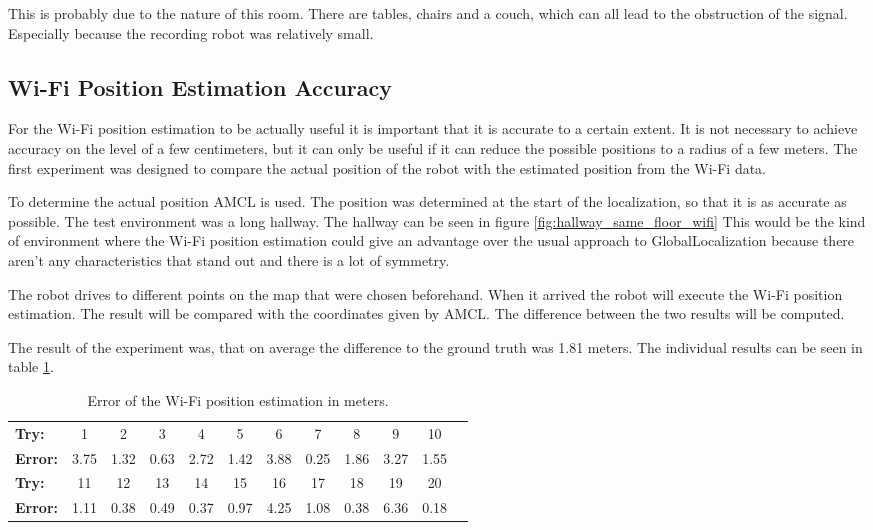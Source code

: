 This is probably due to the nature of this room. There are tables, chairs and a couch, which can all lead to the obstruction of the signal. Especially because the recording robot was relatively small. 

\subsection{Wi-Fi Position Estimation Accuracy}\label{sec:acc}
For the Wi-Fi position estimation to be actually useful it is important that it is accurate to a certain extent. It is not necessary to achieve accuracy on the level of a few centimeters, but it can only be useful if it can reduce the possible positions to a radius of a few meters. The first experiment was designed to compare the actual position of the robot with the estimated position from the Wi-Fi data. 

To determine the actual position AMCL is used. The position was determined at the start of the localization, so that it is as accurate as possible. The test environment was a long hallway. The hallway can be seen in figure \ref{fig:hallway_same_floor_wifi} This would be the kind of environment where the Wi-Fi position estimation could give an advantage over the usual approach to \gls{GlobalLocalization} because there aren't any characteristics that stand out and there is a lot of symmetry. 

The robot drives to different points on the map that were chosen beforehand. When it arrived the robot will execute the Wi-Fi position estimation. The result will be compared with the coordinates given by AMCL. The difference between the two results will be computed.

The result of the experiment was, that on average the difference to the ground truth was 1.81 meters. The individual results can be seen in table \ref{table:exp1}.

\begin{table}
\caption{Error of the Wi-Fi position estimation in meters.}
\label{table:exp1}
\begin{tabular}{l*{10}{c}r}
  \hline			
  \bf Try: & 1 & 2 & 3 & 4 & 5 & 6 & 7 & 8 & 9 & 10 \\
  \bf Error: & 3.75 & 1.32 & 0.63 & 2.72 & 1.42 & 3.88 & 0.25 & 1.86 & 3.27 & 1.55 \\
  \hline  
    \bf Try: & 11 & 12 & 13 & 14 & 15 & 16 & 17 & 18 & 19 & 20 \\
    \bf Error: & 1.11 & 0.38 & 0.49 & 0.37 & 0.97 & 4.25 & 1.08 & 0.38 & 6.36 & 0.18 \\
    \hline  
\end{tabular}
\end{table}



